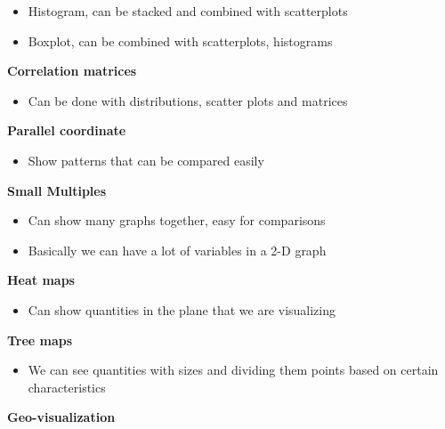 \begin{itemize}
    \item Histogram, can be stacked and combined with scatterplots
    \item Boxplot, can be combined with scatterplots, histograms
\end{itemize}

\vspace{10pt}

\textbf{Correlation matrices}
\begin{itemize}
    \item Can be done with distributions, scatter plots and matrices
\end{itemize}

\textbf{Parallel coordinate}
\begin{itemize}
    \item Show patterns that can be compared easily
\end{itemize}


\vspace{10pt}

\textbf{Small Multiples}

\begin{itemize}

\item Can show many graphs together, easy for comparisons
   
\item Basically we can have a lot of variables in a 2-D graph

\end{itemize}

\vspace{10pt}

\textbf{Heat maps}
\begin{itemize}
    \item Can show quantities in the plane that we are visualizing
\end{itemize}

\vspace{10pt}

\textbf{Tree maps}
\begin{itemize}
    \item We can see quantities with sizes and dividing them points based on certain characteristics
\end{itemize}

\vspace{10pt}

\textbf{Geo-visualization}

